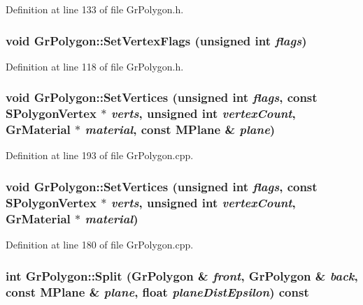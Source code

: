 \begin{CompactItemize}
Definition at line 133 of file GrPolygon.h.\hypertarget{class_gr_polygon_b710c1e840a9047a2288813fc005974d}{
\subsubsection[{SetVertexFlags}]{\setlength{\rightskip}{0pt plus 5cm}void GrPolygon::SetVertexFlags (unsigned int {\em flags})}}
\label{class_gr_polygon_b710c1e840a9047a2288813fc005974d}




Definition at line 118 of file GrPolygon.h.\hypertarget{class_gr_polygon_beed17aedd971fa5874537a4b68d10be}{
\subsubsection[{SetVertices}]{\setlength{\rightskip}{0pt plus 5cm}void GrPolygon::SetVertices (unsigned int {\em flags}, \/  const {\bf SPolygonVertex} $\ast$ {\em verts}, \/  unsigned int {\em vertexCount}, \/  {\bf GrMaterial} $\ast$ {\em material}, \/  const {\bf MPlane} \& {\em plane})}}
\label{class_gr_polygon_beed17aedd971fa5874537a4b68d10be}




Definition at line 193 of file GrPolygon.cpp.\hypertarget{class_gr_polygon_434ae06262ce8bafdf6e9a5e24ec4d28}{
\subsubsection[{SetVertices}]{\setlength{\rightskip}{0pt plus 5cm}void GrPolygon::SetVertices (unsigned int {\em flags}, \/  const {\bf SPolygonVertex} $\ast$ {\em verts}, \/  unsigned int {\em vertexCount}, \/  {\bf GrMaterial} $\ast$ {\em material})}}
\label{class_gr_polygon_434ae06262ce8bafdf6e9a5e24ec4d28}




Definition at line 180 of file GrPolygon.cpp.\hypertarget{class_gr_polygon_71ca719cd4addf47d5c170691a1738f2}{
\subsubsection[{Split}]{\setlength{\rightskip}{0pt plus 5cm}int GrPolygon::Split ({\bf GrPolygon} \& {\em front}, \/  {\bf GrPolygon} \& {\em back}, \/  const {\bf MPlane} \& {\em plane}, \/  float {\em planeDistEpsilon}) const}}
\label{class_gr_polygon_71ca719cd4addf47d5c170691a1738f2}





\end{CompactItemize}
